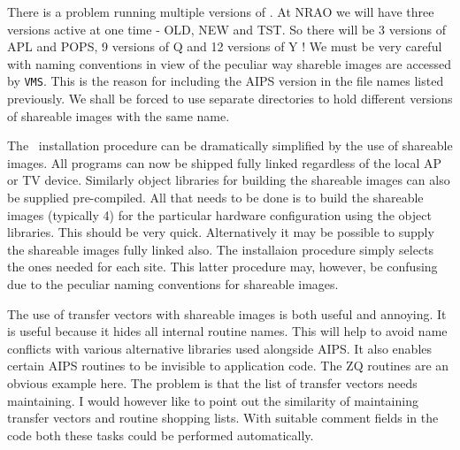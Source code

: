 There is a problem running multiple versions of \AIPS.  At NRAO we will
have three versions active at one time - OLD, NEW and TST. So there will
be 3 versions of APL and POPS, 9 versions of Q and 12 versions of Y !
We must be very careful with naming conventions in view of the
peculiar way shareble images are accessed by {\tt VMS\/}.  This is the reason
for including the AIPS version in the file names listed previously.
We shall be forced to use separate directories to hold different
versions of shareable images with the same name.

The \AIPS\ installation procedure can be dramatically simplified by the
use of shareable images.  All programs can now be shipped fully linked
regardless of the local AP or TV device.  Similarly object libraries
for building the shareable images can also be supplied pre-compiled.
All that needs to be done is to build the shareable images (typically
4) for the particular hardware configuration using the object
libraries.  This should be very quick.  Alternatively it may be
possible to supply the shareable images fully linked also.  The
installaion procedure simply selects the ones needed for each site.
This latter procedure may, however, be confusing due to the peculiar
naming conventions for shareable images.

The use of transfer vectors with shareable images is both useful and
annoying. It is useful because it hides all internal routine names. This
will help to avoid name conflicts with various alternative libraries
used alongside AIPS. It also enables certain AIPS routines to be
invisible to application code. The ZQ routines are an obvious example
here. The problem is that the list of transfer vectors needs
maintaining. I would however like to point out the similarity of
maintaining transfer vectors and routine shopping lists. With suitable
comment fields in the code both these tasks could be performed
automatically.

